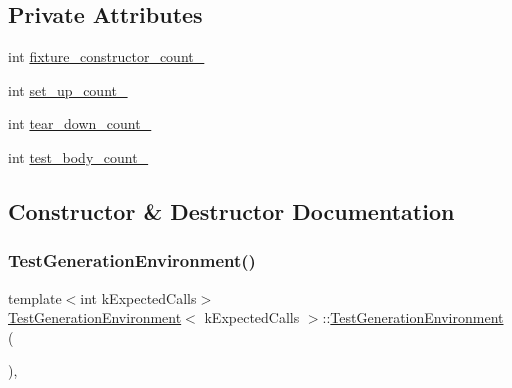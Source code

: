 \subsection*{Private Attributes}
\begin{DoxyCompactItemize}
\item 
int \mbox{\hyperlink{class_test_generation_environment_a106c1554fde078d47a535694a2c700e7}{fixture\+\_\+constructor\+\_\+count\+\_\+}}
\item 
int \mbox{\hyperlink{class_test_generation_environment_a026dbcdb993a8510dbfea85ad71eab8a}{set\+\_\+up\+\_\+count\+\_\+}}
\item 
int \mbox{\hyperlink{class_test_generation_environment_a2b3d02a53e98a72516430d98fd8931ef}{tear\+\_\+down\+\_\+count\+\_\+}}
\item 
int \mbox{\hyperlink{class_test_generation_environment_a7d1ce26e381894b72d2ca7f4630914fa}{test\+\_\+body\+\_\+count\+\_\+}}
\end{DoxyCompactItemize}


\subsection{Constructor \& Destructor Documentation}
\mbox{\label{class_test_generation_environment_acd170900a12de9e9e374366032230301}} 
\subsubsection{\texorpdfstring{TestGenerationEnvironment()}{TestGenerationEnvironment()}\hspace{0.1cm}{\footnotesize\ttfamily [1/3]}}
{\footnotesize\ttfamily template$<$int k\+Expected\+Calls$>$ \\
\mbox{\hyperlink{class_test_generation_environment}{Test\+Generation\+Environment}}$<$ k\+Expected\+Calls $>$\+::\mbox{\hyperlink{class_test_generation_environment}{Test\+Generation\+Environment}} (\begin{DoxyParamCaption}{ }\end{DoxyParamCaption})\hspace{0.3cm}{\ttfamily [inline]}, {\ttfamily [private]}}

